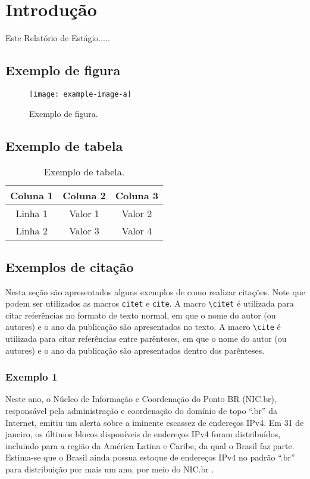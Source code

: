 \chapter{Introdução}
\label{cap:introducao}

Este Relatório de Estágio.....

\section{Exemplo de figura}

\begin{figure}[ht]
	\centering
	\caption{Exemplo de figura.}
	\texttt{[image: example-image-a]}
\end{figure}


\section{Exemplo de tabela}

\begin{table}[ht]
	\centering
	\caption{Exemplo de tabela.}
	\label{tab:exemplo}
	\begin{tabular}{|c|c|c|}
		\hline
		\textbf{Coluna 1} & \textbf{Coluna 2} & \textbf{Coluna 3} \\ \hline
		Linha 1 & Valor 1 & Valor 2 \\ \hline
		Linha 2 & Valor 3 & Valor 4 \\ \hline
	\end{tabular}
\end{table}

\section{Exemplos de citação}

Nesta seção são apresentados alguns exemplos de como realizar citações. Note que podem ser utilizados as macros \verb|citet| e \verb|cite|. A macro \verb|\citet| é utilizada para citar referências no formato de texto normal, em que o nome do autor (ou autores) e o ano da publicação são apresentados no texto. A macro \verb|\cite| é utilizada para citar referências entre parênteses, em que o nome do autor (ou autores) e o ano da publicação são apresentados dentro dos parênteses.

\subsection{Exemplo 1}
Neste ano, o Núcleo de Informação e Coordenação do Ponto BR (NIC.br), responsável pela administração e coordenação do domínio de topo ``.br'' da Internet, emitiu um alerta sobre a iminente escassez de endereços IPv4. Em 31 de janeiro, os últimos blocos disponíveis de endereços IPv4 foram distribuídos, incluindo para a região da América Latina e Caribe, da qual o Brasil faz parte. Estima-se que o Brasil ainda possua estoque de endereços IPv4 no padrão ``.br'' para distribuição por mais um ano, por meio do NIC.br \citep{nicbr2023IANA}.

